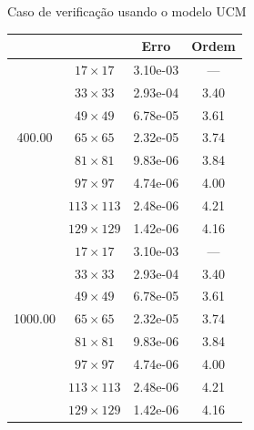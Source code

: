 \begin{frame}{Caso de verificação usando o modelo UCM}
\begin{table}[H]
{\begin{minipage}{0.49\textwidth}
\begin{tabular*}{\textwidth}{@{\extracolsep\fill}cccc@{}}
     & & Erro & Ordem \\
    \hline
    \multirow{7}{*}{400.00} & $17\times 17$ & 3.10e-03 & --- \\
    & $33\times 33$ & 2.93e-04 & 3.40 \\
    & $49\times 49$ & 6.78e-05 & 3.61 \\
    & $65\times 65$ & 2.32e-05 & 3.74 \\
    & $81\times 81$ & 9.83e-06 & 3.84 \\
    & $97\times 97$ & 4.74e-06 & 4.00 \\
    & $113\times 113$ & 2.48e-06 & 4.21 \\
    & $129\times 129$ & 1.42e-06 & 4.16 \\
    \hline
    \multirow{7}{*}{1000.00} & $17\times 17$ & 3.10e-03 & --- \\
    & $33\times 33$ & 2.93e-04 & 3.40 \\
    & $49\times 49$ & 6.78e-05 & 3.61 \\
    & $65\times 65$ & 2.32e-05 & 3.74 \\
    & $81\times 81$ & 9.83e-06 & 3.84 \\
    & $97\times 97$ & 4.74e-06 & 4.00 \\
    & $113\times 113$ & 2.48e-06 & 4.21 \\
    & $129\times 129$ & 1.42e-06 & 4.16 \\
    \hline
    \end{tabular*}
    \end{minipage}
}
\end{table}
\end{frame}

